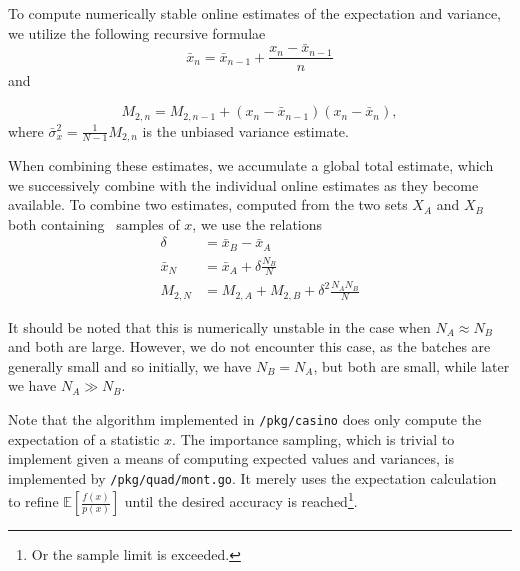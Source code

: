 \documentclass[10pt, a4paper]{article}
\begin{document}

  To compute numerically stable online estimates of the expectation and variance, we utilize the
  following recursive formulae
  \begin{equation}
  \bar{x}_n = \bar{x}_{n-1} + \frac{x_n - \bar{x}_{n-1}}{n}
  \end{equation}
  and

  \begin{equation}
  M_{2,n} = M_{2,n-1} + (x_n - \bar{x}_{n-1})(x_n - \bar{x}_n),
  \end{equation}
  where $\bar{\sigma}_x^2 = \frac{1}{N-1} M_{2,n}$ is the unbiased variance estimate\cite{welford}.

  When combining these estimates, we accumulate a global total estimate, which we successively combine
  with the individual online estimates as they become available. To combine two estimates, computed
  from the two sets $X_A$ and $X_B$ both containing \iid{} samples of $x$, we use the relations\cite{chan}
  \begin{equation}
  \begin{split}
  \delta & = \bar{x}_B - \bar{x}_A \\
  \bar{x}_N & = \bar{x}_A + \delta \frac{N_B}{N} \\
  M_{2,N} & = M_{2,A} + M_{2,B} + \delta^2 \frac{N_A N_B}{N}
  \end{split}
  \end{equation}

  It should be noted that this is numerically unstable in the case when $N_A \approx N_B$ and both
  are large\cite{chan}. However, we do not encounter this case, as the batches are generally small and so initially,
  we have $N_B = N_A$, but both are small, while later we have $N_A \gg N_B$.

  Note that the algorithm implemented in \texttt{/pkg/casino} does only compute the expectation of a
  statistic $x$. The importance sampling, which is trivial to implement given a means of computing
  expected values and variances, is implemented by \texttt{/pkg/quad/mont.go}. It merely uses the
  expectation calculation to refine $\mathbb{E}\left[ \frac{f(x)}{p(x)} \right]$ until the desired
  accuracy is reached\footnote{Or the sample limit is exceeded.}.
\end{document}
